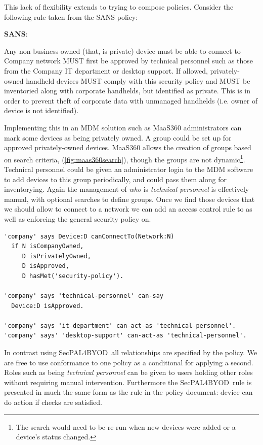 \documentclass{llncs}
\newcommand{\AppPAL}[0]{SecPAL4BYOD}
\newenvironment{policyrule}[1]{%
  \begin{mdframed}\footnotesize
      \noindent\textbf{\sffamily #1}:~\itshape%
}{%
  \end{mdframed}
}
\begin{document}
This lack of flexibility extends to trying to compose policies. 
Consider the following rule taken from the SANS policy:
\begin{policyrule}{SANS}
Any non business-owned (that, is private) device must be able to connect to Company network MUST first be approved by technical personnel such as those from the Company IT department or desktop support.
If allowed, privately-owned handheld devices MUST comply with this security policy and MUST be inventoried along with corporate handhelds, but identified as private. This is in order to prevent theft of corporate data with unmanaged handhelds (i.e. owner of device is not identified).
\end{policyrule}
Implementing this in an MDM solution such as MaaS360 administrators can mark some devices as being privately owned.
A group could be set up for approved privately-owned devices.
MaaS360 allows the creation of groups based on search criteria, (\autoref{fig:maas360search}), though the groups are not dynamic\footnote{The search would need to be re-run when new devices were added or a device's status changed.}.
Technical personnel could be given an administrator login to the MDM software to add devices to this group periodically, and could pass them along for inventorying.
Again the management of \emph{who} is \emph{technical personnel} is effectively manual, with optional searches to define groups.
Once we find those devices that we should allow to connect to a network we can add an access control rule to as well as enforcing the general security policy on.

\begin{lstlisting}
'company' says Device:D canConnectTo(Network:N)
  if N isCompanyOwned,
     D isPrivatelyOwned,
     D isApproved,
     D hasMet('security-policy').

'company' says 'technical-personnel' can-say
  Device:D isApproved.

'company' says 'it-department' can-act-as 'technical-personnel'.
'company' says' 'desktop-support' can-act-as 'technical-personnel'.
\end{lstlisting}

In contrast using \AppPAL~all relationships are specified by the policy.
We are free to use conformance to one policy as a conditional for applying a second.
Roles such as being \emph{technical personnel} can be given to users holding other roles without requiring manual intervention.
Furthermore the \AppPAL~rule is presented in much the same form as the rule in the policy document:  device can do action if checks are satisfied.
\end{document}
